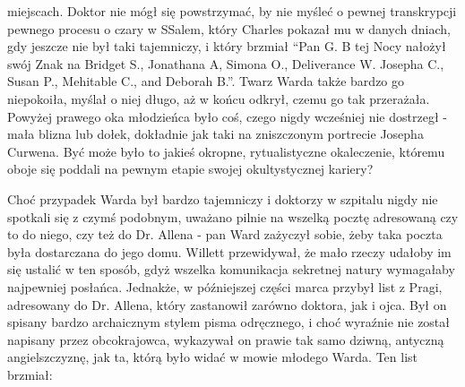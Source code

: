 miejscach. Doktor nie mógł się powstrzymać, by nie myśleć o pewnej transkrypcji pewnego procesu o czary w SSalem, który Charles pokazał mu w danych dniach, gdy jeszcze nie był taki tajemniczy, i który brzmiał ``Pan G. B tej Nocy nałożył swój Znak na Bridget S., Jonathana A, Simona O., Deliverance W. Josepha C., Susan P., Mehitable C., and Deborah B.''. Twarz Warda także bardzo go niepokoiła, myślał o niej długo, aż w końcu odkrył, czemu go tak przerażała. Powyżej prawego oka młodzieńca było coś, czego nigdy wcześniej nie dostrzegł - mała blizna lub dołek, dokładnie jak taki na zniszczonym portrecie Josepha Curwena. Być może było to jakieś okropne, rytualistyczne okaleczenie, któremu oboje się poddali na pewnym etapie swojej okultystycznej kariery?

Choć przypadek Warda był bardzo tajemniczy i doktorzy w szpitalu nigdy nie spotkali się z czymś podobnym, uważano pilnie na wszelką pocztę adresowaną czy to do niego, czy też do Dr. Allena - pan Ward zażyczył sobie, żeby taka poczta była dostarczana do jego domu. Willett przewidywał, że mało rzeczy udałoby im się ustalić w ten sposób, gdyż wszelka komunikacja sekretnej natury wymagałaby najpewniej posłańca. Jednakże, w późniejszej części marca przybył list z Pragi, adresowany do Dr. Allena, który zastanowił zarówno doktora, jak i ojca. Był on spisany bardzo archaicznym stylem pisma odręcznego, i choć wyraźnie nie został napisany przez obcokrajowca, wykazywał on prawie tak samo dziwną, antyczną angielszczyznę, jak ta, którą było widać w mowie młodego Warda. Ten list brzmiał:

